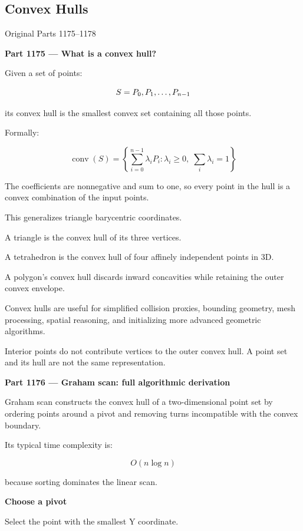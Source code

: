 \subsection{Convex Hulls}\label{04-visual-computing-ii-ch022-convex-hulls}

Original Parts 1175--1178

\textbf{Part 1175 --- What is a convex hull?}

Given a set of points:

\[
S=\\{P_0,P_1,\ldots,P_{n-1}\\}
\]

its convex hull is the smallest convex set containing all those points.

Formally:

\[
\boxed{ \operatorname{conv}(S)= \left\{ \sum_{i=0}^{n-1}\lambda_iP_i: \lambda_i\ge0,\; \sum_i\lambda_i=1 \right\} }
\]

The coefficients are nonnegative and sum to one, so every point in the hull is a convex combination of the input points.

This generalizes triangle barycentric coordinates.

A triangle is the convex hull of its three vertices.

A tetrahedron is the convex hull of four affinely independent points in 3D.

A polygon's convex hull discards inward concavities while retaining the outer convex envelope.

Convex hulls are useful for simplified collision proxies, bounding geometry, mesh processing, spatial reasoning, and initializing more advanced geometric algorithms.

Interior points do not contribute vertices to the outer convex hull. A point set and its hull are not the same representation.

\textbf{Part 1176 --- Graham scan: full algorithmic derivation}

Graham scan constructs the convex hull of a two-dimensional point set by ordering points around a pivot and removing turns incompatible with the convex boundary.

Its typical time complexity is:

\[
\boxed{O(n\log n)}
\]

because sorting dominates the linear scan.

\textbf{Choose a pivot}

Select the point with the smallest Y coordinate.


